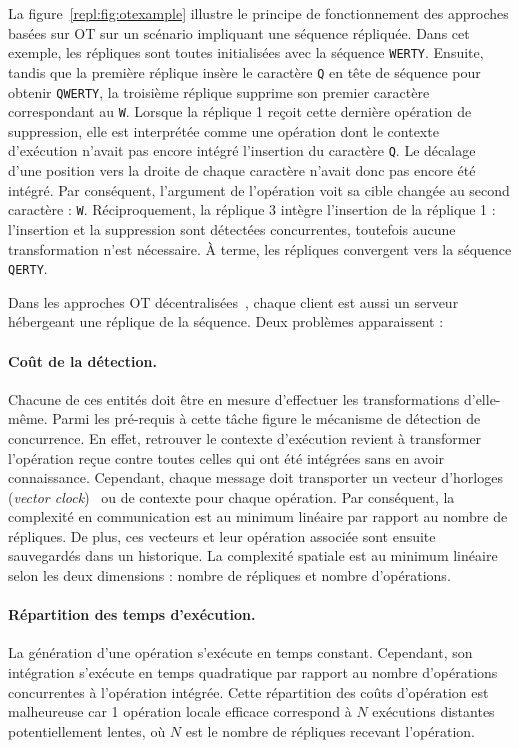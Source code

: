 La figure~\ref{repl:fig:otexample} illustre le principe de fonctionnement des
approches basées sur OT sur un scénario impliquant une séquence répliquée. Dans
cet exemple, les répliques sont toutes initialisées avec la séquence
\texttt{WERTY}. Ensuite, tandis que la première réplique insère le caractère
\texttt{Q} en tête de séquence pour obtenir \texttt{QWERTY}, la troisième
réplique supprime son premier caractère correspondant au \texttt{W}. Lorsque la
réplique 1 reçoit cette dernière opération de suppression, elle est interprétée
comme une opération dont le contexte d'exécution n'avait pas encore intégré
l'insertion du caractère \texttt{Q}. Le décalage d'une position vers la droite
de chaque caractère n'avait donc pas encore été intégré. Par conséquent,
l'argument de l'opération voit sa cible changée au second caractère :
\texttt{W}.  Réciproquement, la réplique 3 intègre l'insertion de la réplique 1
: l'insertion et la suppression sont détectées concurrentes, toutefois aucune
transformation n'est nécessaire. À terme, les répliques convergent vers la
séquence \texttt{QERTY}.

Dans les approches OT décentralisées~\cite{sun2009contextbased}, chaque client
est aussi un serveur hébergeant une réplique de la séquence. Deux problèmes
apparaissent : 

\paragraph{Coût de la détection.} Chacune de ces entités doit être en mesure
d'effectuer les transformations d'elle-même. Parmi les pré-requis à cette tâche
figure le mécanisme de détection de concurrence. En effet, retrouver le contexte
d'exécution revient à transformer l'opération reçue contre toutes celles qui ont
été intégrées sans en avoir connaissance. Cependant, chaque message doit
transporter un vecteur d'horloges (\emph{vector clock})~\cite{lamport1978time}
ou de contexte pour chaque opération. Par conséquent, la complexité en
communication est au minimum linéaire par rapport au nombre de répliques.  De
plus, ces vecteurs et leur opération associée sont ensuite sauvegardés dans un
historique. La complexité spatiale est au minimum linéaire selon les deux
dimensions : nombre de répliques et nombre d'opérations.

\paragraph{Répartition des temps d'exécution.} La génération d'une opération
s'exécute en temps constant. Cependant, son intégration s'exécute en temps
quadratique par rapport au nombre d'opérations concurrentes à l'opération
intégrée. Cette répartition des coûts d'opération est malheureuse car 1
opération locale efficace correspond à $N$ exécutions distantes potentiellement
lentes, où $N$ est le nombre de répliques recevant l'opération.


